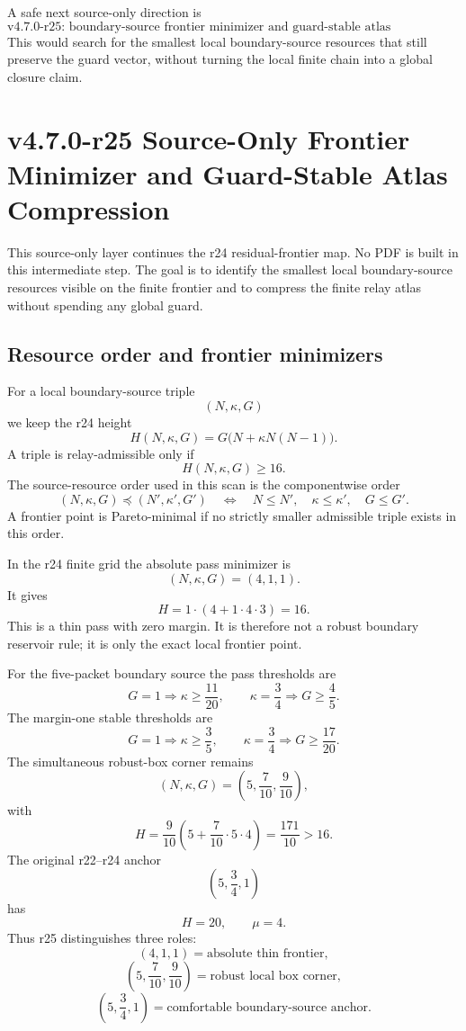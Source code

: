 A safe next source-only direction is
\[
\boxed{
\text{v4.7.0-r25: boundary-source frontier minimizer and guard-stable atlas compression.}
}
\]
This would search for the smallest local boundary-source resources that still
preserve the guard vector, without turning the local finite chain into a global
closure claim.



\section{v4.7.0-r25 Source-Only Frontier Minimizer and Guard-Stable Atlas Compression}
\label{sec:v470-r25-frontier-minimizer-atlas-compression}

This source-only layer continues the r24 residual-frontier map.  No PDF is
built in this intermediate step.  The goal is to identify the smallest local
boundary-source resources visible on the finite frontier and to compress the
finite relay atlas without spending any global guard.

\subsection{Resource order and frontier minimizers}
\label{subsec:v470-r25-resource-order-frontier-minimizers}

For a local boundary-source triple
\[
(N,\kappa,G)
\]
we keep the r24 height
\[
H(N,\kappa,G)=G\bigl(N+\kappa N(N-1)\bigr).
\]
A triple is relay-admissible only if
\[
H(N,\kappa,G)\geq16.
\]
The source-resource order used in this scan is the componentwise order
\[
(N,\kappa,G)\preceq (N',\kappa',G')
\quad\Longleftrightarrow\quad
N\leq N',\quad \kappa\leq\kappa',\quad G\leq G'.
\]
A frontier point is Pareto-minimal if no strictly smaller admissible triple
exists in this order.

In the r24 finite grid the absolute pass minimizer is
\[
\boxed{(N,\kappa,G)=(4,1,1).}
\]
It gives
\[
H=1\cdot(4+1\cdot4\cdot3)=16.
\]
This is a thin pass with zero margin.  It is therefore not a robust boundary
reservoir rule; it is only the exact local frontier point.

For the five-packet boundary source the pass thresholds are
\[
G=1\Rightarrow \kappa\geq\frac{11}{20},
\qquad
\kappa=\frac34\Rightarrow G\geq\frac45.
\]
The margin-one stable thresholds are
\[
G=1\Rightarrow \kappa\geq\frac35,
\qquad
\kappa=\frac34\Rightarrow G\geq\frac{17}{20}.
\]
The simultaneous robust-box corner remains
\[
\boxed{(N,\kappa,G)=\left(5,\frac7{10},\frac9{10}\right),}
\]
with
\[
H=\frac9{10}\left(5+\frac7{10}\cdot5\cdot4\right)
=\frac{171}{10}>16.
\]
The original r22--r24 anchor
\[
\left(5,\frac34,1\right)
\]
has
\[
H=20,
\qquad
\mu=4.
\]
Thus r25 distinguishes three roles:
\[
\boxed{(4,1,1)=\text{absolute thin frontier},}
\]
\[
\boxed{\left(5,\frac7{10},\frac9{10}\right)=\text{robust local box corner},}
\]
\[
\boxed{\left(5,\frac34,1\right)=\text{comfortable boundary-source anchor}.}
\]

